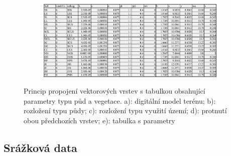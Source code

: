 \begin{figure}[t!]
\begin{subfigure}[b]{0.4\linewidth}
    \caption{\label{fig:prunik}}
  \end{subfigure}\\
  \begin{subfigure}[b]{0.8\linewidth}
    \centering\includegraphics[width=1\linewidth]{./img/soilvegtablo.png}
    \caption{\label{fig:soilvegtablo}}
  \end{subfigure}%
  \caption{Princip propojení vektorových vrstev s tabulkou obsahující parametry typu půd a vegetace. a): digitální model terénu;  b): rozložení typu půdy; c):  rozložení typu využití území; d): protnutí obou předchozích vrstev; e): tabulka s parametry}
  \label{fig:soillu}
\end{figure}




























\subsection{Srážková data} \label{sec:vstupsrazka}

